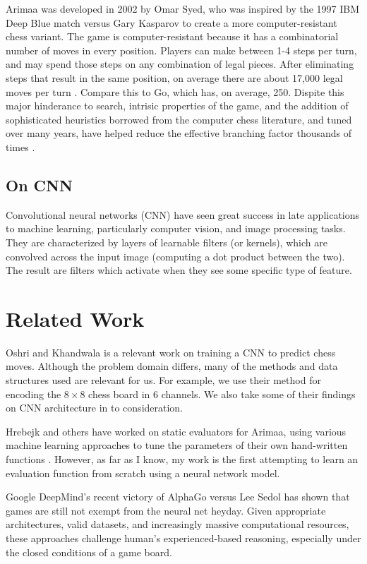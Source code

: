 \documentclass{article}
\begin{document}
Arimaa was developed in 2002 by Omar Syed, who was inspired by the 1997 IBM Deep Blue match versus Gary Kasparov to create a more computer-resistant chess variant.  The game is computer-resistant because it has a combinatorial number of moves in every position.  Players can make between 1-4 steps per turn, and may spend those steps on any combination of legal pieces.  After eliminating steps that result in the same position, on average there are about 17,000 legal moves per turn \cite{haskin}.  Compare this to Go, which has, on average, 250.  Dispite this major hinderance to search, intrisic properties of the game, and the addition of sophisticated heuristics borrowed from the computer chess literature, and tuned over many years, have helped reduce the effective branching factor thousands of times \cite{wu}.

\subsection{On CNN}

Convolutional neural networks (CNN) have seen great success in late applications to machine learning, particularly computer vision, and image processing tasks.  They are characterized by layers of learnable filters (or kernels), which are convolved across the input image (computing a dot product between the two).  The result are filters which activate when they see some specific type of feature.  

\section{Related Work}

Oshri and Khandwala \cite{Oshri_Khandwala} is a relevant work on training a CNN to predict chess moves.  Although the problem domain differs, many of the methods and data structures used are relevant for us.  For example, we use their method for encoding the $8\times 8$ chess board in 6 channels.  We also take some of their findings on CNN architecture in to consideration.

Hrebejk and others have worked on static evaluators for Arimaa, using various machine learning approaches to tune the parameters of their own hand-written functions \cite{Hrebejk}.  However, as far as I know, my work is the first attempting to learn an evaluation function from scratch using a neural network model.

Google DeepMind's recent victory of AlphaGo versus Lee Sedol has shown that games are still not exempt from the neural net heyday.  Given appropriate architectures, valid datasets, and increasingly massive computational resources, these approaches challenge human's experienced-based reasoning, especially under the closed conditions of a game board.
\end{document}
